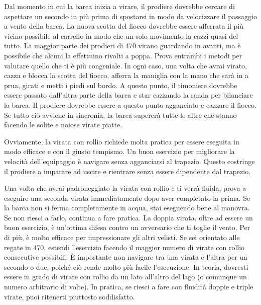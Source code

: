 Dal momento in cui la barca inizia a virare, il prodiere dovrebbe cercare di
aspettare un secondo in più prima di spostarsi in modo da velocizzare il
passaggio a vento della barca. La nuova scotta del fiocco dovrebbe essere
afferrata il più vicino possibile al carrello in modo che un solo movimento la
cazzi quasi del tutto. La maggior parte dei prodieri di 470 virano guardando in
avanti, ma è possibile che alcuni la effettuino rivolti a poppa. Prova entrambi
i metodi per valutare quello che ti è più congeniale. In ogni caso, una volta
che avrai virato, cazza e blocca la scotta del fiocco, afferra la maniglia con
la mano che sarà in a prua, girati e metti i piedi sul bordo. A questo punto, il
timoniere dovrebbe essere passato dall'altra parte della barca e star cazzando
la randa per bilanciare la barca. Il prodiere dovrebbe essere a questo punto
agganciato e cazzare il fiocco. Se tutto ciò avviene in sincronia, la barca
supererà tutte le altre che stanno facendo le solite e noiose virate piatte.

Ovviamente, la virata con rollio richiede molta pratica per essere eseguita in
modo efficace e con il giusto tempismo. Un buon esercizio per migliorare la
velocità dell'equipaggio è navigare senza agganciarsi al trapezio. Questo
costringe il prodiere a imparare ad uscire e rientrare senza essere dipendente
dal trapezio.

Una volta che avrai padroneggiato la virata con rollio e ti verrà fluida, prova
a eseguire una seconda virata immediatamente dopo aver completato la prima. Se
la barca non si ferma completamente in acqua, stai eseguendo bene al manovra. Se
non riesci a farlo, continua a fare pratica. La doppia virata, oltre ad essere
un buon esercizio, è un'ottima difesa contro un avversario che ti toglie il
vento. Per di più, è molto efficace per impressionare gli altri velisti. Se sei
orientato alle regate in 470, estendi l'esercizio facendo il maggior numero di
virate con rollio consecutive possibili. È importante non navigare tra una
virata e l'altra per un secondo o due, poiché ciò rende molto più facile
l'esecuzione. In teoria, dovresti essere in grado di virare con rollio da un
lato all'altro del lago (o comunque un numero arbitrario di volte). In pratica,
se riesci a fare con fluidità doppie e triple virate, puoi ritenerti piuttosto
soddisfatto.

